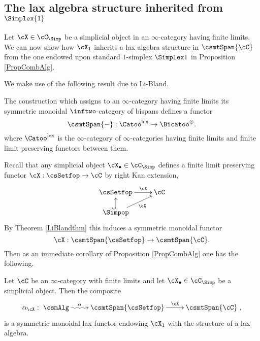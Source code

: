 \documentclass[a4paper]{article}
\numberwithin{equation}{section}
\begin{document}
\subsection{The lax algebra structure inherited from \texorpdfstring{$\Simplex{1}$}{the standard 1-simplex}}
\label{Sec:intospaces}

Let $\cX \in \cC_\Simp$ be a simplicial object in an $\infty$-category having finite limits. We can now show how $\cX_1$ inherits a lax algebra structure in $\csmtSpan{\cC}$ from the one endowed upon standard $1$-simplex $\Simplex 1$ in Proposition \ref{PropCombAlg}. 

We make use of the following result due to Li-Bland.
\begin{thm}
\label{LiBlandthm}
 The construction which assigns to an $\infty$-category having finite limits its symmetric monoidal $\inftwo$-category of bispans defines a functor
 \begin{equation*}
  \csmtSpan{-}: \Catoo^{\rm lex} \to \Bicatoo^\otimes.
 \end{equation*}
where $\Catoo^{\rm lex}$ is the $\infty$-category of $\infty$-categories having finite limits and finite limit preserving functors between them.
\end{thm}

Recall that any simplicial object $\cX_\bullet \in \cC_\Simp$ defines a finite limit preserving functor $\cX:\csSetfop \to \cC$  by right Kan extension,
\begin{equation*}
 \xymatrixrowsep{1.1pc} \xymatrix{ \csSetfop \ar[r]^-\cX & \cC \\
 \Simpop \ar@{^{(}->}[u] \ar[ru]_-\cX & }
\end{equation*}
By Theorem \ref{LiBlandthm} this induces a symmetric monoidal functor
\begin{equation*}
 \cX: \csmtSpan{\csSetfop} \to \csmtSpan{\cC}.
\end{equation*}
Then as an immediate corollary of Proposition \ref{PropCombAlg} one has the following.
\begin{thm}
\label{MainLaxAlg}
 Let $\cC$ be an $\infty$-category with finite limits and let $\cX_\bullet \in \cC_\Simp$ be a simplicial object. Then the composite
 \begin{equation*}
  \alpha_\cX: \xymatrix{\csmAlg \ar@{~>}[r]^-{\alpha} & \csmtSpan{\csSetfop} \ar[r]^-\cX & \csmtSpan{\cC}},
 \end{equation*}
is a symmetric monoidal lax functor endowing $\cX_1$ with the structure of a lax algebra.
\end{thm}
\end{document}
